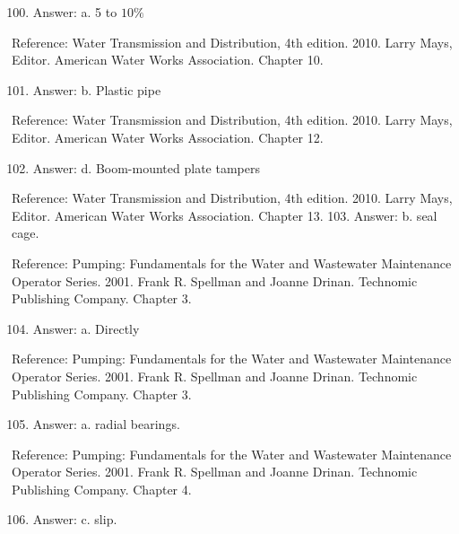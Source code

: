 \documentclass[10pt]{article}
\begin{document}
\begin{enumerate}
  \setcounter{enumi}{99}
  \item Answer: a. 5 to $10 \%$
\end{enumerate}

Reference: Water Transmission and Distribution, 4th edition. 2010. Larry Mays, Editor. American Water Works Association. Chapter 10.

\begin{enumerate}
  \setcounter{enumi}{100}
  \item Answer: b. Plastic pipe
\end{enumerate}

Reference: Water Transmission and Distribution, 4th edition. 2010. Larry Mays, Editor. American Water Works Association. Chapter 12.

\begin{enumerate}
  \setcounter{enumi}{101}
  \item Answer: d. Boom-mounted plate tampers
\end{enumerate}

Reference: Water Transmission and Distribution, 4th edition. 2010. Larry Mays, Editor. American Water Works Association. Chapter 13. 103. Answer: b. seal cage.

Reference: Pumping: Fundamentals for the Water and Wastewater Maintenance Operator Series. 2001. Frank R. Spellman and Joanne Drinan. Technomic Publishing Company. Chapter 3.

\begin{enumerate}
  \setcounter{enumi}{103}
  \item Answer: a. Directly
\end{enumerate}

Reference: Pumping: Fundamentals for the Water and Wastewater Maintenance Operator Series. 2001. Frank R. Spellman and Joanne Drinan. Technomic Publishing Company. Chapter 3.

\begin{enumerate}
  \setcounter{enumi}{104}
  \item Answer: a. radial bearings.
\end{enumerate}

Reference: Pumping: Fundamentals for the Water and Wastewater Maintenance Operator Series. 2001. Frank R. Spellman and Joanne Drinan. Technomic Publishing Company. Chapter 4.

\begin{enumerate}
  \setcounter{enumi}{105}
  \item Answer: c. slip.
\end{enumerate}
\end{document}
